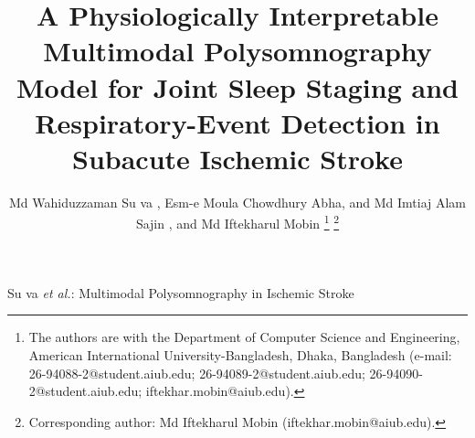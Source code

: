 \documentclass[journal]{IEEEtran}
\providecommand{\DIFaddtex}[1]{{\protect\color{blue} \sf #1}} %
\providecommand{\DIFdeltex}[1]{{\protect\color{red} \scriptsize #1}} %
\providecommand{\DIFaddbegin}{} %
\providecommand{\DIFaddend}{} %
\providecommand{\DIFdelbegin}{} %
\providecommand{\DIFdelend}{} %
\providecommand{\DIFadd}[1]{\texorpdfstring{\DIFaddtex{#1}}{#1}} %
\providecommand{\DIFdel}[1]{\texorpdfstring{\DIFdeltex{#1}}{}} %
\providecommand{\DIFscaledelfig}{0.5}
\newlength{\DIFdelgraphicswidth} %
\newlength{\DIFdelgraphicsheight} %
\providecommand{\DIFaddincludegraphics}[2][]{{\color{blue}\fbox{\DIFOincludegraphics[#1]{#2}}}} %
\providecommand{\DIFdelincludegraphics}[2][]{%
\sbox{\DIFdelgraphicsbox}{\DIFOincludegraphics[#1]{#2}}%
\settoboxwidth{\DIFdelgraphicswidth}{\DIFdelgraphicsbox} %
\settoboxtotalheight{\DIFdelgraphicsheight}{\DIFdelgraphicsbox} %
\scalebox{\DIFscaledelfig}{%
\parbox[b]{\DIFdelgraphicswidth}{\usebox{\DIFdelgraphicsbox}\\[-\baselineskip] \rule{\DIFdelgraphicswidth}{0em}}\llap{\resizebox{\DIFdelgraphicswidth}{\DIFdelgraphicsheight}{%
\setlength{\unitlength}{\DIFdelgraphicswidth}%
\begin{picture}(1,1)%
\thicklines\linethickness{2pt} %
{\color[rgb]{1,0,0}\put(0,0){\framebox(1,1){}}}%
{\color[rgb]{1,0,0}\put(0,0){\line( 1,1){1}}}%
{\color[rgb]{1,0,0}\put(0,1){\line(1,-1){1}}}%
\end{picture}%
}\hspace*{3pt}}} %
} %
\DeclareRobustCommand{\DIFaddbegin}{\DIFOaddbegin \let\includegraphics\DIFaddincludegraphics} %
\DeclareRobustCommand{\DIFaddend}{\DIFOaddend \let\includegraphics\DIFOincludegraphics} %
\DeclareRobustCommand{\DIFdelbegin}{\DIFOdelbegin \let\includegraphics\DIFdelincludegraphics} %
\DeclareRobustCommand{\DIFdelend}{\DIFOaddend \let\includegraphics\DIFOincludegraphics} %
\begin{document}
\title{\DIFaddbegin \DIFadd{A Physiologically Interpretable }\DIFaddend Multimodal \DIFdelbegin \DIFdel{Polysomnography }\DIFdelend \DIFaddbegin \DIFadd{Model }\DIFaddend for Joint Sleep Staging and Respiratory-Event Detection in Subacute Ischemic Stroke}

\author{Md Wahiduzzaman Su\DIFaddbegin \DIFadd{v}\DIFaddend a , Esm-e Moula Chowdhury Abha, \DIFdelbegin \DIFdel{and }\DIFdelend Md Imtiaj Alam Sajin\DIFaddbegin \DIFadd{,
and Md Iftekharul Mobin}\DIFaddend %
\DIFdelbegin %
\DIFdelend \DIFaddbegin \thanks{The authors are with the Department of Computer Science and Engineering,
American International University-Bangladesh, Dhaka, Bangladesh
(e-mail: 26-94088-2@student.aiub.edu; 26-94089-2@student.aiub.edu;
26-94090-2@student.aiub.edu; iftekhar.mobin@aiub.edu).}%
\thanks{Corresponding author: Md Iftekharul Mobin (iftekhar.mobin@aiub.edu).}\DIFaddend }

%
{Su\DIFaddbegin \DIFadd{v}\DIFaddend a \MakeLowercase{\textit{et al.}}: Multimodal Polysomnography in Ischemic Stroke}

\maketitle
\end{document}
